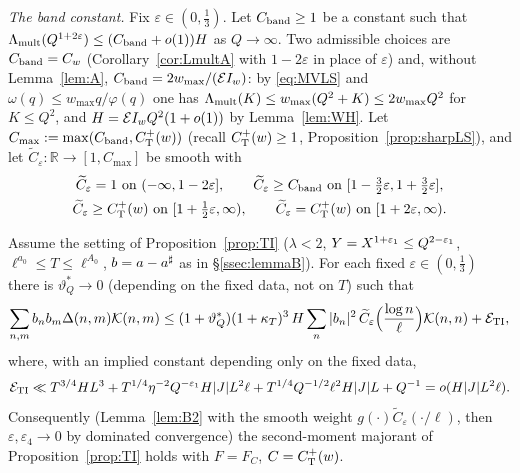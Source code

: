 \emph{The band constant.} Fix $\varepsilon\in(0,\frac13)$. Let $C_{\rm band}\ge1$ be a constant such that $\Lambda_{\mathrm{mult}}(Q^{1+2\varepsilon})\le(C_{\rm band}+o(1))H$ as
$Q\to\infty$. Two admissible choices are $C_{\rm band}=C_w$ (Corollary~\ref{cor:LmultA} with $1-2\varepsilon$ in place of $\varepsilon$) and, without Lemma~\ref{lem:A},
$C_{\rm band}=2w_{\max}/(\mathcal{E}I_w)$: by \eqref{eq:MVLS} and $\omega(q)\le w_{\max}q/\varphi(q)$ one has $\Lambda_{\mathrm{mult}}(K)\le w_{\max}(Q^2+K)\le2w_{\max}Q^2$ for
$K\le Q^2$, and $H=\mathcal{E}I_w Q^2(1+o(1))$ by Lemma~\ref{lem:WH}. Let $C_{\max}:=\max(C_{\rm band},C^{+}_{\mathrm T}(w))$ (recall $C^{+}_{\mathrm T}(w)\ge1$,
Proposition~\ref{prop:sharpLS}), and let $\widetilde C_\varepsilon:\mathbb R\to[1,C_{\max}]$ be smooth with
\begin{gather*}
 \widetilde C_\varepsilon=1\ \text{on }(-\infty,1-2\varepsilon],\qquad \widetilde C_\varepsilon\ge C_{\rm band}\ \text{on }[1-\tfrac32\varepsilon,1+\tfrac32\varepsilon],\\
 \widetilde C_\varepsilon\ge\CTp(w)\ \text{on }[1+\tfrac12\varepsilon,\infty),\qquad \widetilde C_\varepsilon=\CTp(w)\ \text{on }[1+2\varepsilon,\infty).
\end{gather*}

\begin{proposition}\label{prop:TIsharp}
Assume the setting of Proposition~\ref{prop:TI} ($\lambda<2$, $Y=X^{1+\varepsilon_1}\le Q^{2-\varepsilon_1}$, $\ell^{a_0}\le T\le\ell^{A_0}$, $b=a-a^\sharp$ as in
\S\ref{ssec:lemmaB}). For each fixed $\varepsilon\in(0,\frac13)$ there is $\vartheta^*_Q\to0$ (depending on the fixed data, not on $T$) such that
\begin{equation}\label{eqC:TIsharp}
 \sum_{n,m}b_nb_m\Delta(n,m)\mathcal{K}(n,m)\le(1+\vartheta^*_Q)(1+\kappa_T)^3\,H\sum_n|b_n|^2\,\widetilde C_\varepsilon\Big(\frac{\log n}\ell\Big)\mathcal{K}(n,n)+\mathcal E_{\rm TI},
\end{equation}
where, with an implied constant depending only on the fixed data,
\[
 \mathcal E_{\rm TI}\ll T^{3/4}HL^3+T^{1/4}\eta^{-2}Q^{-\varepsilon_1}H|J|L^2\ell+T^{1/4}Q^{-1/2}\ell^2H|J|L+Q^{-1}=o(H|J|L^2\ell).
\]
Consequently (Lemma~\ref{lem:B2} with the smooth weight $g(\cdot)\widetilde C_\varepsilon(\cdot/\ell)$, then $\varepsilon,\varepsilon_4\to0$ by dominated
convergence) the second-moment majorant of Proposition~\ref{prop:TI} holds with $F=F_{C}$, $C=C^{+}_{\mathrm T}(w)$.
\end{proposition}

